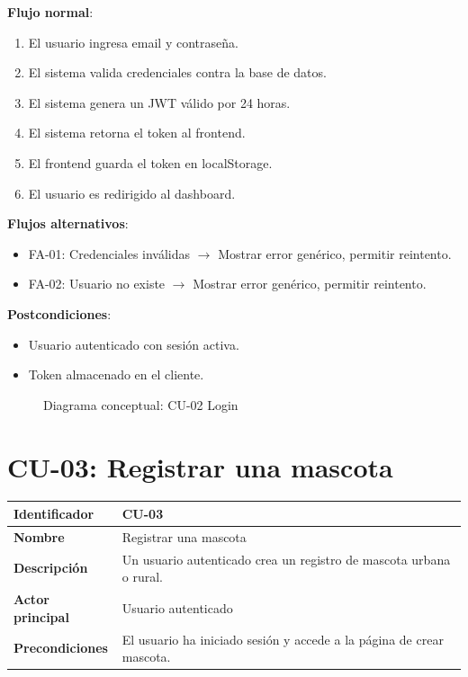 \documentclass[12pt,a4paper]{article}
\begin{document}
\vspace{0.5em}

\textbf{Flujo normal}:
\begin{enumerate}[leftmargin=*]
    \item El usuario ingresa email y contrase\~na.
    \item El sistema valida credenciales contra la base de datos.
    \item El sistema genera un JWT v\'alido por 24 horas.
    \item El sistema retorna el token al frontend.
    \item El frontend guarda el token en localStorage.
    \item El usuario es redirigido al dashboard.
\end{enumerate}

\textbf{Flujos alternativos}:
\begin{itemize}[leftmargin=*]
    \item FA-01: Credenciales inv\'alidas $\rightarrow$ Mostrar error gen\'erico, permitir reintento.
    \item FA-02: Usuario no existe $\rightarrow$ Mostrar error gen\'erico, permitir reintento.
\end{itemize}

\textbf{Postcondiciones}:
\begin{itemize}[leftmargin=*]
    \item Usuario autenticado con sesi\'on activa.
    \item Token almacenado en el cliente.
\end{itemize}

\begin{figure}[h]
\centering
{}
\caption{Diagrama conceptual: CU-02 Login}
\end{figure}

\newpage

\section{CU-03: Registrar una mascota}

\begin{tabular}{|p{3.5cm}|p{10cm}|}
\hline
\textbf{Identificador} & CU-03 \\
\hline
\textbf{Nombre} & Registrar una mascota \\
\hline
\textbf{Descripci\'on} & Un usuario autenticado crea un registro de mascota urbana o rural. \\
\hline
\textbf{Actor principal} & Usuario autenticado \\
\hline
\textbf{Precondiciones} & El usuario ha iniciado sesi\'on y accede a la p\'agina de crear mascota. \\
\hline
\end{tabular}
\end{document}
